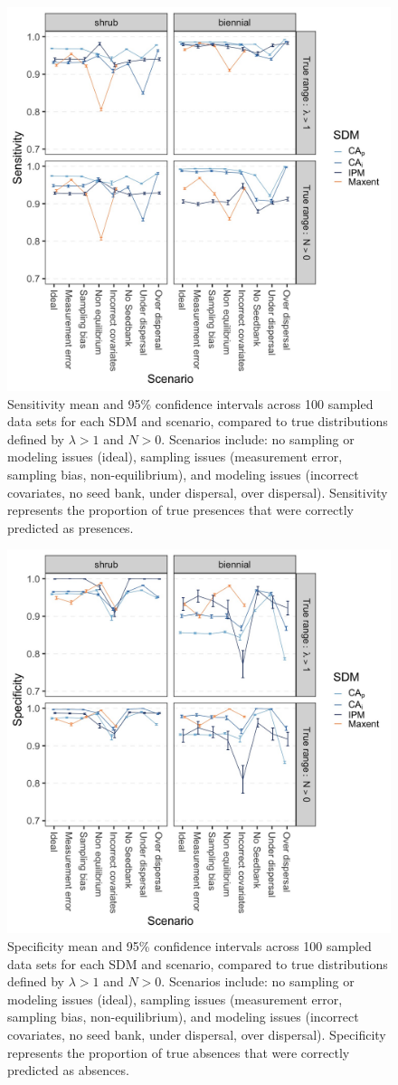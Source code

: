 \documentclass[]{article}
\begin{document}
\begin{figure}
    \centering\includegraphics[width=.75\linewidth]{../../figs/Supp_Sens_mn+CI.jpg}
    \caption{\label{fig:SensitivityMed} Sensitivity mean and 95\% confidence intervals across 100 sampled data sets for each SDM and scenario, compared to true distributions defined by $\lambda > 1$ and $N > 0$. Scenarios include: no sampling or modeling issues (ideal), sampling issues (measurement error, sampling bias, non-equilibrium), and modeling issues (incorrect covariates, no seed bank, under dispersal, over dispersal). Sensitivity represents the proportion of true presences that were correctly predicted as presences.}
\end{figure}

\begin{figure}
    \centering\includegraphics[width=.75\linewidth]{../../figs/Supp_Spec_mn+CI.jpg}
    \caption{\label{fig:SpecificityMed} Specificity mean and 95\% confidence intervals across 100 sampled data sets for each SDM and scenario, compared to true distributions defined by $\lambda > 1$ and $N > 0$. Scenarios include: no sampling or modeling issues (ideal), sampling issues (measurement error, sampling bias, non-equilibrium), and modeling issues (incorrect covariates, no seed bank, under dispersal, over dispersal). Specificity represents the proportion of true absences that were correctly predicted as absences.}
\end{figure}
\end{document}
